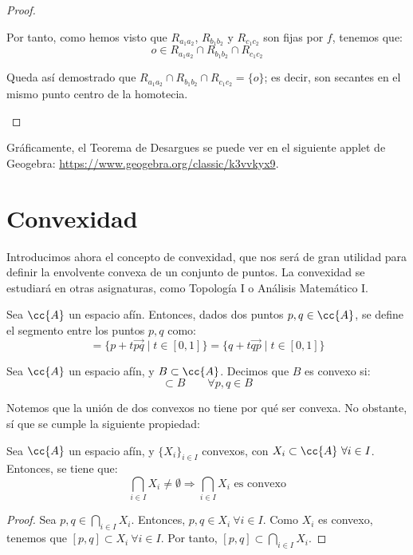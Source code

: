 \begin{proof}
\begin{itemize}
        Por tanto, como hemos visto que $R_{a_1a_2}$, $R_{b_1b_2}$ y $R_{c_1c_2}$ son fijas por $f$, tenemos que:
        \begin{equation*}
            o\in R_{a_1a_2} \cap R_{b_1b_2} \cap R_{c_1c_2}
        \end{equation*}

        Queda así demostrado que $R_{a_1a_2}\cap R_{b_1b_2} \cap R_{c_1c_2}=\{o\}$; es decir, son secantes en el mismo punto centro de la homotecia.


    

    \end{itemize}
    
\end{proof}

Gráficamente, el Teorema de Desargues se puede ver en el siguiente applet de Geogebra: 
\href{https://www.geogebra.org/classic/k3vvkyx9}{https://www.geogebra.org/classic/k3vvkyx9}.






\section{Convexidad}
Introducimos ahora el concepto de convexidad, que nos será de gran utilidad para definir la envolvente convexa de un conjunto de puntos.
La convexidad se estudiará en otras asignaturas, como Topología I o Análisis Matemático I.
\begin{definicion}[Segmento]
    Sea $\cc{A}$ un espacio afín. Entonces, dados dos puntos $p,q\in \cc{A}$, se define el segmento entre los puntos $p,q$ como:
    \begin{equation*}
        [p,q]=\{p+t\vec{pq}\mid t\in [0,1]\}=\{q+t\vec{qp}\mid t\in [0,1]\}
    \end{equation*}
\end{definicion}

\begin{definicion}
    Sea $\cc{A}$ un espacio afín, y $B\subset \cc{A}$. Decimos que $B$ es convexo si:
    \begin{equation*}
        [p,q]\subset B \qquad \forall p,q\in B
    \end{equation*}
\end{definicion}

Notemos que la unión de dos convexos no tiene por qué ser convexa. No obstante, sí que se cumple la siguiente propiedad:
\begin{prop}
    Sea $\cc{A}$ un espacio afín, y $\{X_i\}_{i\in I}$ convexos, con $X_i\subset \cc{A}~\forall i\in I$. Entonces, se tiene que:
    \begin{equation*}
        \bigcap_{i\in I}X_i \neq \emptyset \Longrightarrow \bigcap_{i\in I}X_i \text{ es convexo}
    \end{equation*}
\end{prop}
\begin{proof}
    Sea $p,q\in \bigcap_{i\in I}X_i$. Entonces, $p,q\in X_i~\forall i\in I$. Como $X_i$ es convexo, tenemos que $[p,q]\subset X_i~\forall i\in I$.
    Por tanto, $[p,q]\subset \bigcap_{i\in I}X_i$.
\end{proof}

